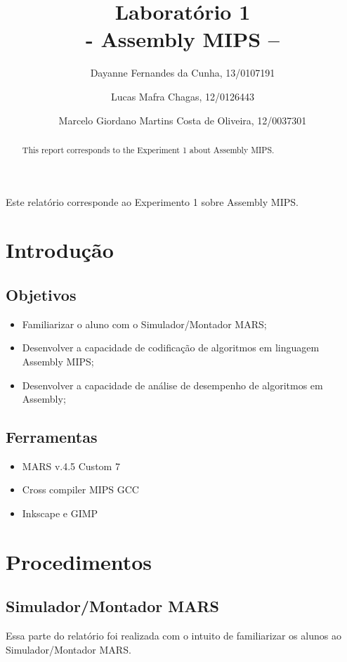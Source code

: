 \documentclass[12pt]{article}
\title{Laboratório 1\\- Assembly MIPS –}
\author{Dayanne Fernandes da Cunha, 13/0107191}
\author{Lucas Mafra Chagas, 12/0126443}
\author{Marcelo Giordano Martins Costa de Oliveira, 12/0037301}
\begin{document}
\maketitle

 \begin{abstract}
	This report corresponds to the Experiment 1 about Assembly MIPS.
 \end{abstract}
 \begin{resumo}
	Este relatório corresponde ao Experimento 1 sobre Assembly MIPS.
 \end{resumo}

\section{Introdução}
\label{sec:Introducao}

\subsection{Objetivos}
\label{sec:Objetivos}

\begin{itemize}
\item Familiarizar o aluno com o Simulador/Montador MARS;
\item Desenvolver a capacidade de codificação de algoritmos em linguagem Assembly MIPS;
\item Desenvolver a capacidade de análise de desempenho de algoritmos em Assembly;
\end{itemize}

\subsection{Ferramentas}
\label{sec:Materiais}

\begin{itemize}
\item MARS v.4.5 Custom 7
\item Cross compiler MIPS GCC
\item Inkscape e GIMP
\end{itemize}

\section{Procedimentos}
\label{sec:Procedimentos}

\subsection{Simulador/Montador MARS}
\label{subsec:mars}
Essa parte do relatório foi realizada com o intuito de familiarizar os alunos ao Simulador/Montador MARS.
\end{document}
